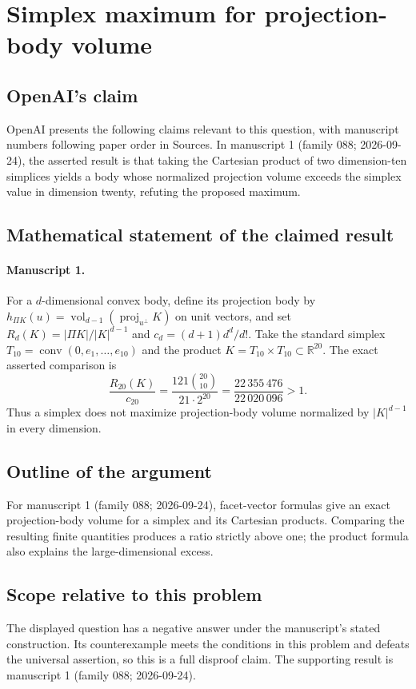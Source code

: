 \documentclass[11pt]{article}
\begin{document}
\section*{Simplex maximum for projection-body volume}

\subsection{OpenAI's claim}
OpenAI presents the following claims relevant to this question, with manuscript numbers following paper order in Sources. In manuscript 1 (family 088; 2026-09-24), the asserted result is that taking the Cartesian product of two dimension-ten simplices yields a body whose normalized projection volume exceeds the simplex value in dimension twenty, refuting the proposed maximum.

\subsection{Mathematical statement of the claimed result}
\paragraph{Manuscript 1.}
For a $d$-dimensional convex body, define its projection body by $h_{\Pi K}(u)=\operatorname{vol}_{d-1}(\operatorname{proj}_{u^{\perp}}K)$ on unit vectors, and set $R_d(K)=|\Pi K|/|K|^{d-1}$ and $c_d=(d+1)d^d/d!$. Take the standard simplex $T_{10}=\operatorname{conv}(0,e_1,\ldots,e_{10})$ and the product $K=T_{10}\times T_{10}\subset\mathbb R^{20}$. The exact asserted comparison is
\[
 \frac{R_{20}(K)}{c_{20}}=\frac{121\binom{20}{10}}{21\cdot2^{20}}
 =\frac{22\,355\,476}{22\,020\,096}>1.
\]
Thus a simplex does not maximize projection-body volume normalized by $|K|^{d-1}$ in every dimension.

\subsection{Outline of the argument}
For manuscript 1 (family 088; 2026-09-24), facet-vector formulas give an exact projection-body volume for a simplex and its Cartesian products. Comparing the resulting finite quantities produces a ratio strictly above one; the product formula also explains the large-dimensional excess.

\subsection{Scope relative to this problem}
The displayed question has a negative answer under the manuscript's stated construction. Its counterexample meets the conditions in this problem and defeats the universal assertion, so this is a full disproof claim. The supporting result is manuscript 1 (family 088; 2026-09-24).
\end{document}
